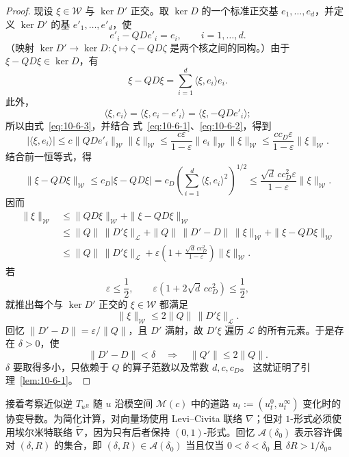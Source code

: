 \begin{proof}
现设 $\xi\in\mathcal W$ 与 $\ker D'$ 正交。取 $\ker D$ 的一个标准正交基
$e_1,\ldots,e_d$，并定义 $\ker D'$ 的基
$e'_1,\ldots,e'_d$，使
\[
  e'_i-QDe'_i=e_i,
  \qquad i=1,\ldots,d.
\]
（映射
$\ker D'\to\ker D:\zeta\mapsto\zeta-QD\zeta$
是两个核之间的同构。）由于 $\xi-QD\xi\in\ker D$，有
\[
  \xi-QD\xi=\sum_{i=1}^d\langle\xi,e_i\rangle e_i.
\]
此外，
\[
  \langle\xi,e_i\rangle
  =\langle\xi,e_i-e'_i\rangle
  =\langle\xi,-QDe'_i\rangle;
\]
所以由式~\eqref{eq:10-6-3}，并结合
式~\eqref{eq:10-6-1}、\eqref{eq:10-6-2}，得到
\[
  |\langle\xi,e_i\rangle|
  \le c\|QDe'_i\|_{\mathcal W}\|\xi\|_{\mathcal W}
  \le\frac{c\varepsilon}{1-\varepsilon}
      \|e_i\|_{\mathcal W}\|\xi\|_{\mathcal W}
  \le\frac{cc_D\varepsilon}{1-\varepsilon}\|\xi\|_{\mathcal W}.
\]
结合前一恒等式，得
\[
  \|\xi-QD\xi\|_{\mathcal W}
  \le c_D|\xi-QD\xi|
  =c_D\left(\sum_{i=1}^d\langle\xi,e_i\rangle^2\right)^{1/2}
  \le\frac{\sqrt d\,c c_D^2\varepsilon}{1-\varepsilon}
      \|\xi\|_{\mathcal W}.
\]
因而
\[
\begin{aligned}
  \|\xi\|_{\mathcal W}
  &\le\|QD\xi\|_{\mathcal W}+\|\xi-QD\xi\|_{\mathcal W}\\
  &\le\|Q\|\,\|D'\xi\|_{\mathcal L}
     +\|Q\|\,\|D'-D\|\,\|\xi\|_{\mathcal W}
     +\|\xi-QD\xi\|_{\mathcal W}\\
  &\le\|Q\|\,\|D'\xi\|_{\mathcal L}
     +\varepsilon\left(1+
       \frac{\sqrt d\,c c_D^2}{1-\varepsilon}\right)
       \|\xi\|_{\mathcal W}.
\end{aligned}
\]
若
\[
  \varepsilon\le\frac12,
  \qquad
  \varepsilon(1+2\sqrt d\,c c_D^2)\le\frac12,
\]
就推出每个与 $\ker D'$ 正交的 $\xi\in\mathcal W$ 都满足
\[
  \|\xi\|_{\mathcal W}\le2\|Q\|\,\|D'\xi\|_{\mathcal L}.
\]
回忆 $\|D'-D\|=\varepsilon/\|Q\|$，且 $D'$ 满射，故 $D'\xi$
遍历 $\mathcal L$ 的所有元素。于是存在 $\delta>0$，使
\[
  \|D'-D\|<\delta\quad\Longrightarrow\quad\|Q'\|\le2\|Q\|.
\]
$\delta$ 要取得多小，只依赖于 $Q$ 的算子范数以及常数 $d,c,c_D$。
这就证明了引理~\ref{lem:10-6-1}。
\end{proof}

接着考察近似逆 $T_{u^R}$ 随 $u$ 沿模空间 $\mathcal M(c)$ 中的道路
$u_t:=(u_t^0,u_t^\infty)$ 变化时的协变导数。为简化计算，对向量场使用
Levi--Civita 联络 $\nabla$；但对 $1$-形式必须使用埃尔米特联络
$\widetilde\nabla$，因为只有后者保持 $(0,1)$-形式。回忆
$\mathcal A(\delta_0)$ 表示容许偶对 $(\delta,R)$ 的集合，即
$(\delta,R)\in\mathcal A(\delta_0)$ 当且仅当
$0<\delta<\delta_0$ 且 $\delta R>1/\delta_0$。

